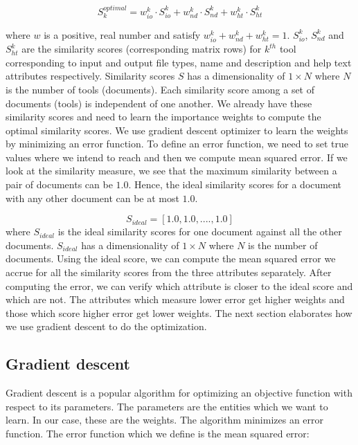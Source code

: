 \begin{equation}
S_k^{optimal} = w^k_{io} \cdot S^k_{io} +  w^k_{nd} \cdot S^k_{nd} + w^k_{ht} \cdot S^k_{ht}
\end{equation}

where $w$ is a positive, real number and satisfy $w^k_{io} + w^k_{nd} + w^k_{ht} = 1$. 
$S^k_{io}$, $S^k_{nd}$ and $S^k_{ht}$ are the similarity scores (corresponding matrix rows) for $k^{th}$ tool corresponding to input and output file types, name and description and help text attributes respectively. Similarity scores $S$ has a dimensionality of $1 \times N$ where $N$ is the number of tools (documents). Each similarity score among a set of documents (tools) is independent of one another. We already have these similarity scores and need to learn the importance weights to compute the optimal similarity scores. We use gradient descent optimizer to learn the weights by minimizing an error function. To define an error function, we need to set true values where we intend to reach and then we compute mean squared error. If we look at the similarity measure, we see that the maximum similarity between a pair of documents can be $1.0$. Hence, the ideal similarity scores for a document with any other document can be at most $1.0$.

\begin{equation}
S_{ideal} = [ 1.0, 1.0, ...., 1.0 ]
\end{equation}
where $S_{ideal}$ is the ideal similarity scores for one document against all the other documents. $S_{ideal}$ has a dimensionality of $1 \times N$ where $N$ is the number of documents. Using the ideal score, we can compute the mean squared error we accrue for all the similarity scores from the three attributes separately. After computing the error, we can verify which attribute is closer to the ideal score and which are not. The attributes which measure lower error get higher weights and those which score higher error get lower weights. The next section elaborates how we use gradient descent to do the optimization.

\subsection{Gradient descent}
Gradient descent is a popular algorithm for optimizing an objective function with respect to its parameters. The parameters are the entities which we want to learn. In our case, these are the weights. The algorithm minimizes an error function. The error function which we define is the mean squared error:

